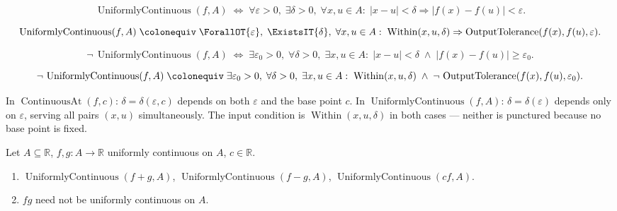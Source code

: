 \begin{remark*}
\[
  \operatorname{UniformlyContinuous}(f,A)
  \;\iff\;
  \forall\varepsilon>0,\;\exists\delta>0,\;\forall x,u\in A:\;
  |x-u|<\delta \Rightarrow |f(x)-f(u)|<\varepsilon.
\]
\end{remark*}

\begin{remark*}
\[
  \operatorname{UniformlyContinuous}(f,A)
  \;\colonequiv\;
  \ForallOT{\varepsilon},\;\ExistsIT{\delta},\;
  \forall x,u\in A:\;
  \operatorname{Within}(x,u,\delta)
  \Rightarrow
  \operatorname{OutputTolerance}(f(x),f(u),\varepsilon).
\]
\end{remark*}

\begin{remark*}
\[
  \neg\,\operatorname{UniformlyContinuous}(f,A)
  \;\iff\;
  \exists\varepsilon_0>0,\;\forall\delta>0,\;\exists x,u\in A:\;
  |x-u|<\delta \;\wedge\; |f(x)-f(u)|\geq\varepsilon_0.
\]
\end{remark*}

\begin{remark*}
\[
  \neg\,\operatorname{UniformlyContinuous}(f,A)
  \;\colonequiv\;
  \exists\varepsilon_0>0,\;\forall\delta>0,\;\exists x,u\in A:\;
  \operatorname{Within}(x,u,\delta)
  \;\wedge\;
  \neg\,\operatorname{OutputTolerance}(f(x),f(u),\varepsilon_0).
\]
\end{remark*}

\begin{remark*}
In $\operatorname{ContinuousAt}(f,c)$: $\delta=\delta(\varepsilon,c)$
depends on both $\varepsilon$ and the base point $c$. In
$\operatorname{UniformlyContinuous}(f,A)$: $\delta=\delta(\varepsilon)$
depends only on $\varepsilon$, serving all pairs $(x,u)$
simultaneously. The input condition is $\operatorname{Within}(x,u,\delta)$
in both cases — neither is punctured because no base point is fixed.
\end{remark*}


\begin{theorem}
\label{thm:algebra-of-uniform-continuity-general}
Let $A\subseteq\mathbb{R}$, $f,g:A\to\mathbb{R}$ uniformly
continuous on $A$, $c\in\mathbb{R}$.
\begin{enumerate}[label=(\alph*)]
  \item $\operatorname{UniformlyContinuous}(f+g,A)$,
    $\operatorname{UniformlyContinuous}(f-g,A)$,
    $\operatorname{UniformlyContinuous}(cf,A)$.
  \item $fg$ need not be uniformly continuous on $A$.
\end{enumerate}
\end{theorem}


